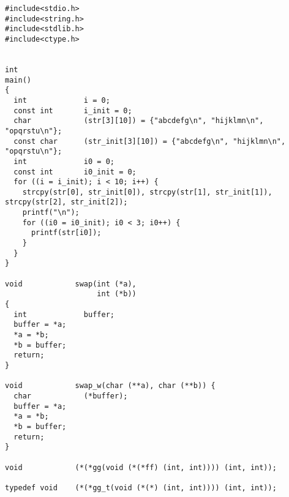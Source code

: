  \begin{verbatim}
#include<stdio.h>
#include<string.h>
#include<stdlib.h>
#include<ctype.h>


int 
main()
{
  int             i = 0;
  const int       i_init = 0;
  char            (str[3][10]) = {"abcdefg\n", "hijklmn\n", "opqrstu\n"};
  const char      (str_init[3][10]) = {"abcdefg\n", "hijklmn\n", "opqrstu\n"};
  int             i0 = 0;
  const int       i0_init = 0;
  for ((i = i_init); i < 10; i++) {
    strcpy(str[0], str_init[0]), strcpy(str[1], str_init[1]), strcpy(str[2], str_init[2]);
    printf("\n");
    for ((i0 = i0_init); i0 < 3; i0++) {
      printf(str[i0]);
    }
  }
}

void            swap(int (*a), 
                     int (*b))
{
  int             buffer;
  buffer = *a;
  *a = *b;
  *b = buffer;
  return;
}

void            swap_w(char (**a), char (**b)) {
  char            (*buffer);
  buffer = *a;
  *a = *b;
  *b = buffer;
  return;
}

void            (*(*gg(void (*(*ff) (int, int)))) (int, int));

typedef void    (*(*gg_t(void (*(*) (int, int)))) (int, int));
\end{verbatim} 
